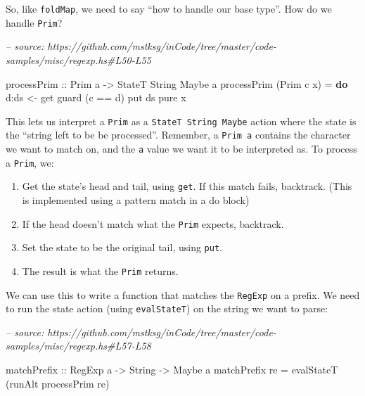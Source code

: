 \documentclass[]{article}
\newenvironment{Shaded}{}{}
\newcommand{\CommentTok}[1]{\textcolor[rgb]{0.38,0.63,0.69}{\textit{#1}}}
\newcommand{\DataTypeTok}[1]{\textcolor[rgb]{0.56,0.13,0.00}{#1}}
\newcommand{\FunctionTok}[1]{\textcolor[rgb]{0.02,0.16,0.49}{#1}}
\newcommand{\KeywordTok}[1]{\textcolor[rgb]{0.00,0.44,0.13}{\textbf{#1}}}
\newcommand{\NormalTok}[1]{#1}
\newcommand{\OtherTok}[1]{\textcolor[rgb]{0.00,0.44,0.13}{#1}}
\begin{document}
So, like \texttt{foldMap}, we need to say ``how to handle our base type''. How
do we handle \texttt{Prim}?

\begin{Shaded}
\begin{Highlighting}[]
\CommentTok{-- source: https://github.com/mstksg/inCode/tree/master/code-samples/misc/regexp.hs#L50-L55}

\OtherTok{processPrim ::} \DataTypeTok{Prim}\NormalTok{ a }\OtherTok{->} \DataTypeTok{StateT} \DataTypeTok{String} \DataTypeTok{Maybe}\NormalTok{ a}
\NormalTok{processPrim (}\DataTypeTok{Prim}\NormalTok{ c x) }\FunctionTok{=} \KeywordTok{do}
\NormalTok{    d}\FunctionTok{:}\NormalTok{ds }\OtherTok{<-}\NormalTok{ get}
\NormalTok{    guard (c }\FunctionTok{==}\NormalTok{ d)}
\NormalTok{    put ds}
    \FunctionTok{pure}\NormalTok{ x}
\end{Highlighting}
\end{Shaded}

This lets us interpret a \texttt{Prim} as a \texttt{StateT\ String\ Maybe}
action where the state is the ``string left to be be processed''. Remember, a
\texttt{Prim\ a} contains the character we want to match on, and the \texttt{a}
value we want it to be interpreted as. To process a \texttt{Prim}, we:

\begin{enumerate}
\def\labelenumi{\arabic{enumi}.}
\tightlist
\item
  Get the state's head and tail, using \texttt{get}. If this match fails,
  backtrack. (This is implemented using a pattern match in a do block)
\item
  If the head doesn't match what the \texttt{Prim} expects, backtrack.
\item
  Set the state to be the original tail, using \texttt{put}.
\item
  The result is what the \texttt{Prim} returns.
\end{enumerate}

We can use this to write a function that matches the \texttt{RegExp} on a
prefix. We need to run the state action (using \texttt{evalStateT}) on the
string we want to parse:

\begin{Shaded}
\begin{Highlighting}[]
\CommentTok{-- source: https://github.com/mstksg/inCode/tree/master/code-samples/misc/regexp.hs#L57-L58}

\OtherTok{matchPrefix ::} \DataTypeTok{RegExp}\NormalTok{ a }\OtherTok{->} \DataTypeTok{String} \OtherTok{->} \DataTypeTok{Maybe}\NormalTok{ a}
\NormalTok{matchPrefix re }\FunctionTok{=}\NormalTok{ evalStateT (runAlt processPrim re)}
\end{Highlighting}
\end{Shaded}
\end{document}
